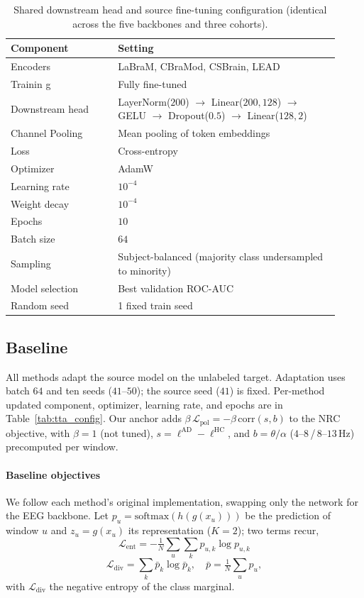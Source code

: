 \documentclass[letterpaper]{article} %
\begin{document}
\begin{table}[t]\centering\small
\begin{tabular}{p{0.30\linewidth}p{0.62\linewidth}}
\toprule
\textbf{Component} & \textbf{Setting} \\
\midrule
Encoders & LaBraM, CBraMod, CSBrain, LEAD \\
Trainin g & Fully fine-tuned \\
Downstream head & LayerNorm($200$) $\rightarrow$ Linear($200,128$) $\rightarrow$ GELU
$\rightarrow$ Dropout($0.5$) $\rightarrow$ Linear($128,2$) \\
Channel Pooling & Mean pooling of token embeddings \\
Loss & Cross-entropy \\
Optimizer & AdamW \\
Learning rate & $10^{-4}$ \\
Weight decay & $10^{-4}$ \\
Epochs & $10$ \\
Batch size & $64$ \\
Sampling & Subject-balanced (majority class undersampled to minority) \\
Model selection & Best validation ROC-AUC \\
Random seed & 1 fixed train seed \\
\bottomrule
\end{tabular}
\caption{Shared downstream head and source fine-tuning configuration (identical across the five
backbones and three cohorts).}
\label{tab:training}
\end{table}


\subsection{Baseline} 
All methods adapt the source model on the unlabeled target. Adaptation uses batch $64$ and ten seeds ($41$--$50$); the source seed ($41$) is fixed. Per-method updated component, optimizer, learning rate, and epochs are in Table~\ref{tab:tta_config}. Our anchor adds $\beta\,\mathcal{L}_{\mathrm{pol}}=-\beta\,\mathrm{corr}(s,b)$ to the NRC objective, with $\beta{=}1$ (not tuned), $s=\ell^{\mathrm{AD}}-\ell^{\mathrm{HC}}$, and $b=\theta/\alpha$
($4$--$8$\,/\,$8$--$13$\,Hz) precomputed per window.


\paragraph{Baseline objectives} We follow each method's original implementation, swapping only the
network for the EEG backbone. Let $p_u=\mathrm{softmax}(h(g(x_u)))$ be the prediction of window $u$
and $z_u=g(x_u)$ its representation ($K{=}2$); two terms recur,
\begin{equation*}
\mathcal{L}_{\mathrm{ent}}=-\tfrac{1}{N}\sum_{u}\sum_{k}p_{u,k}\log p_{u,k}
\end{equation*}
\begin{equation*}
\mathcal{L}_{\mathrm{div}}=\sum_{k}\bar p_{k}\log\bar p_{k},\quad \bar p=\tfrac{1}{N}\sum_{u}p_u,
\end{equation*}
with $\mathcal{L}_{\mathrm{div}}$ the negative entropy of the class marginal.
\end{document}
